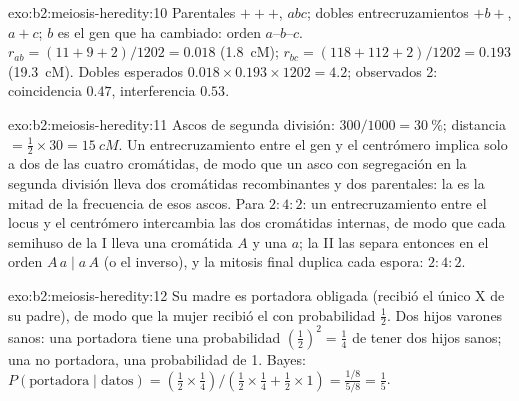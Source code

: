 \begin{solution}{exo:b2:meiosis-heredity:10}
Parentales $+++$, $abc$; dobles entrecruzamientos $+b+$, $a+c$; $b$ es
el gen que ha cambiado: orden $a$--$b$--$c$. $r_{ab} = (11 + 9 + 2)/1202
= 0.018$ (\qty{1.8}{cM}); $r_{bc} = (118 + 112 + 2)/1202 = 0.193$
(\qty{19.3}{cM}). Dobles esperados $0.018\times 0.193\times 1202 =
4.2$; observados 2: coincidencia $0.47$, interferencia $0.53$.
\end{solution}

\begin{solution}{exo:b2:meiosis-heredity:11}
Ascos de segunda división: $300/1000 = \qty{30}{\%}$; distancia $=
\tfrac12\times 30 = \qty{15}{cM}$. Un entrecruzamiento entre el gen y el
centrómero implica solo a dos de las cuatro cromátidas, de modo que un
asco con segregación en la segunda división lleva dos cromátidas
recombinantes y dos parentales: la  es la
mitad de la frecuencia de esos ascos. Para $2 : 4 : 2$: un
entrecruzamiento entre el locus y el centrómero intercambia las dos
cromátidas internas, de modo que cada semihuso de la  I lleva una
cromátida $A$ y una $a$; la  II las separa entonces en el orden
$A\,a \mid
a\,A$ (o el inverso), y la mitosis final duplica cada espora:
$2 : 4 : 2$.
\end{solution}

\begin{solution}{exo:b2:meiosis-heredity:12}
Su madre es portadora obligada (recibió el único X de su padre), de modo
que la mujer recibió el  con probabilidad $\tfrac12$. Dos hijos
varones sanos: una portadora tiene una probabilidad
$(\tfrac12)^2 = \tfrac14$ de tener dos hijos sanos; una no portadora,
una probabilidad de 1. Bayes:
$P(\text{portadora}\mid\text{datos}) = (\tfrac12\times\tfrac14)/(\tfrac12
\times\tfrac14 + \tfrac12\times 1) = \tfrac{1/8}{5/8} = \tfrac15$.
\end{solution}

